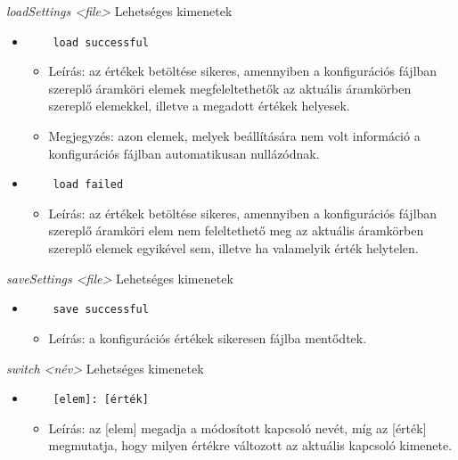\textit{loadSettings <file>}\newline
Lehetséges kimenetek
\begin{itemize}
	\item
	\begin{verbatim}
	load successful
	\end{verbatim}
	\begin{itemize}
		\item Leírás: az értékek betöltése sikeres, amennyiben a konfigurációs fájlban szereplő áramköri elemek megfeleltethetők az aktuális áramkörben szereplő elemekkel, illetve a megadott értékek helyesek.
		\item Megjegyzés: azon elemek, melyek beállítására nem volt információ a konfigurációs fájlban automatikusan nullázódnak.
	\end{itemize}
	\item
	\begin{verbatim}
	load failed
	\end{verbatim}
	\begin{itemize}
		\item Leírás: az értékek betöltése sikeres, amennyiben a konfigurációs fájlban szereplő áramköri elem nem feleltethető meg az aktuális áramkörben szereplő elemek egyikével sem, illetve ha valamelyik érték helytelen.
	\end{itemize}
\end{itemize}

\textit{saveSettings <file>}\newline
Lehetséges kimenetek
\begin{itemize}
	\item
	\begin{verbatim}
	save successful
	\end{verbatim}
	\begin{itemize}
		\item Leírás: a konfigurációs értékek sikeresen fájlba mentődtek.
	\end{itemize}
\end{itemize}

\textit{switch <név>}\newline
Lehetséges kimenetek
\begin{itemize}
	\item
	\begin{verbatim}
	[elem]: [érték]
	\end{verbatim}
	\begin{itemize}
		\item Leírás: az [elem] megadja a módosított kapcsoló nevét, míg az [érték] megmutatja, hogy milyen értékre változott az aktuális kapcsoló kimenete. 
	\end{itemize}
\end{itemize}

